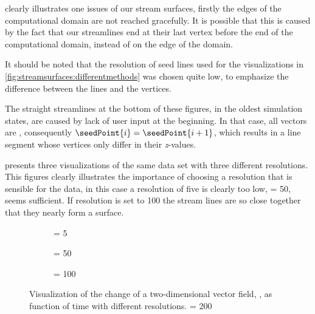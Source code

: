  clearly illustrates one issues of our stream surfaces, firstly the edges of the computational domain are not reached gracefully. It is possible that this is caused by the fact that our streamlines end at their last vertex before the end of the computational domain, instead of on the edge of the domain.

It should be noted that the resolution of seed lines used for the visualizations in \cref{fig:streamsurfaces:differentmethods} was chosen quite low, to emphasize the difference between the lines and the vertices.

The straight streamlines at the bottom of these figures, \ie in the oldest simulation states, are caused by lack of user input at the beginning. In that case, all vectors are , consequently $\seedPoint{i} = \seedPoint{i + 1}$, which results in a line segment whose vertices only differ in their \textit{z}-values.

 presents three visualizations of the same data set with three different resolutions. This figures clearly illustrates the importance of choosing a resolution that is sensible for the data, in this case a resolution of five is clearly too low, \resolution = 50, seems sufficient. If resolution is set to 100 the stream lines are so close together that they nearly form a surface. 

\begin{figure}
	\centering
	\begin{subfigure}[b]{0.3\textwidth}
		\centering
		\caption{\resolution = 5}
		\label{fig:streamsurfaces:differentResolution:r5}
	\end{subfigure}
	\begin{subfigure}[b]{0.3\textwidth}
		\centering
		\caption{\resolution = 50}
		\label{fig:streamsurfaces:differentResolution:r50}
	\end{subfigure} 
	\begin{subfigure}[b]{0.3\textwidth}
		\centering
		\caption{\resolution = 100}
		\label{fig:streamsurfaces:differentResolution:r100}
	\end{subfigure} 
	\caption{Visualization of the change of a two-dimensional vector field, \velocity, as function of time with different resolutions. %
	\numStates = 200}
	\label{fig:streamsurfaces:differentResolution}
\end{figure}

